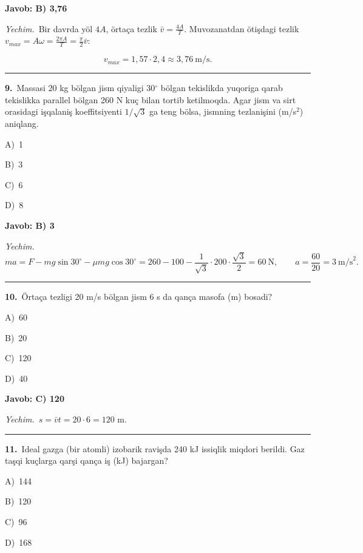 \documentclass[11pt,a4paper]{article}
\newcommand{\opt}[2]{\hspace*{4mm}#1)\ #2\par}
\begin{document}
\noindent\colorbox{gray!12}{\parbox{\dimexpr\linewidth-2\fboxsep}{\textbf{Javob: B) 3,76}}}\par\smallskip
\noindent\textit{Yechim.}\ Bir davrda yöl $4A$, örtaça tezlik $\bar v=\frac{4A}{T}$. Muvozanatdan ötişdagi tezlik $v_{max}=A\omega=\frac{2\pi A}{T}=\frac{\pi}{2}\bar v$:\par
\[v_{max}=1{,}57\cdot2{,}4\approx3{,}76\ \text{m/s}.\]\par\medskip\hrule\medskip
{}\noindent\begin{minipage}{\linewidth}
\textbf{9.}\ Massasi 20 kg bölgan jism qiyaligi 30$^\circ$ bölgan tekislikda yuqoriga qarab tekislikka parallel bölgan 260 N kuç bilan tortib ketilmoqda. Agar jism va sirt orasidagi işqalaniş koeffitsiyenti $1/\sqrt{3}$ ga teng bölsa, jismning tezlanişini (m/s$^{2}$) aniqlang.\par\smallskip
\opt{A}{1}
\opt{B}{3}
\opt{C}{6}
\opt{D}{8}
\end{minipage}\vspace{2pt}\par
\noindent\colorbox{gray!12}{\parbox{\dimexpr\linewidth-2\fboxsep}{\textbf{Javob: B) 3}}}\par\smallskip
\noindent\textit{Yechim.}\ \[ma=F-mg\sin30^\circ-\mu mg\cos30^\circ=260-100-\frac{1}{\sqrt3}\cdot200\cdot\frac{\sqrt3}{2}=60\ \text{N},\qquad a=\frac{60}{20}=3\ \text{m/s}^2.\]\par\medskip\hrule\medskip
{}\noindent\begin{minipage}{\linewidth}
\textbf{10.}\ Örtaça tezligi 20 m/s bölgan jism 6 s da qança masofa (m) bosadi?\par\smallskip
\opt{A}{60}
\opt{B}{20}
\opt{C}{120}
\opt{D}{40}
\end{minipage}\vspace{2pt}\par
\noindent\colorbox{gray!12}{\parbox{\dimexpr\linewidth-2\fboxsep}{\textbf{Javob: C) 120}}}\par\smallskip
\noindent\textit{Yechim.}\ $s=\bar vt=20\cdot6=120$ m.\par\par\medskip\hrule\medskip
{}\noindent\begin{minipage}{\linewidth}
\textbf{11.}\ Ideal gazga (bir atomli) izobarik ravişda 240 kJ issiqlik miqdori berildi. Gaz taşqi kuçlarga qarşi qança iş (kJ) bajargan?\par\smallskip
\opt{A}{144}
\opt{B}{120}
\opt{C}{96}
\opt{D}{168}
\end{minipage}\vspace{2pt}\par
\end{document}
